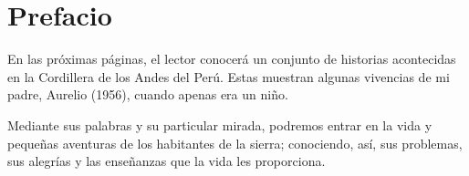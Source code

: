 \cleardoublepage
\newpage
\thispagestyle{empty}
\vfill


\chapter*{Prefacio} %

En las próximas páginas, el lector conocerá un conjunto de historias acontecidas en la Cordillera de los Andes del Perú. Estas muestran algunas vivencias de mi padre, Aurelio (1956), cuando apenas era un niño. %

Mediante sus palabras y su particular mirada, podremos entrar en la vida y pequeñas aventuras de los habitantes de la sierra; conociendo, así, sus problemas, sus alegrías y las enseñanzas que la vida les proporciona.
\vfill

\newpage
\thispagestyle{empty}
